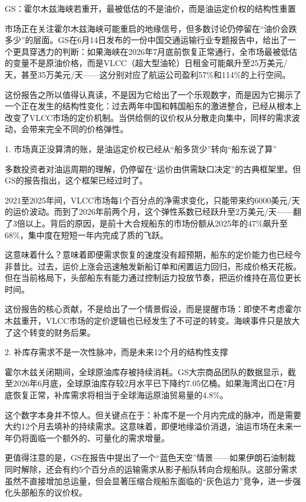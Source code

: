 \documentclass[11pt]{ctexart}
\begin{document}
GS：霍尔木兹海峡若重开，最被低估的不是油价，而是油运定价权的结构性重置

市场正在关注霍尔木兹海峡可能重启的地缘信号，但多数讨论仍停留在“油价会跌多少”的层面。GS在6月14日发布的一份中国交通运输行业专题报告中，给出了一个更具穿透力的判断：如果海峡在2026年7月底前恢复正常通行，全市场最被低估的变量不是原油价格，而是VLCC（超大型油轮）日租金可能飙升至25万美元/天，甚至35万美元/天——这分别对应了航运公司盈利57\%和114\%的上行空间。

这份报告之所以值得认真读，不是因为它给出了一个乐观数字，而是因为它揭示了一个正在发生的结构性变化：过去两年中国和韩国船东的激进整合，已经从根本上改变了VLCC市场的定价机制。当供给侧的议价权从分散走向集中，同样的需求波动，会带来完全不同的价格弹性。

1. 市场真正没算清的账，是油运定价权已经从“船多货少”转向“船东说了算”

多数投资者对油运周期的理解，仍停留在“运价由供需缺口决定”的古典框架里。但GS的报告指出，这个框架已经过时了。

2021至2025年间，VLCC市场每1个百分点的净需求变化，只能带来约6000美元/天的运价波动。而到了2026年前两个月，这个弹性系数已经跃升至2万美元/天——翻了3倍以上。背后的原因，是前十大合规船东的市场份额从2025年的47\%飙升至68\%，集中度在短短一年内完成了质的飞跃。

这意味着什么？意味着即便需求恢复的速度没有超预期，船东的定价能力也已经今非昔比。过去，运价上涨会迅速触发新船订单和闲置运力回归，形成价格天花板。但在当前格局下，头部船东有能力通过控制运力投放节奏，把运价维持在高位更长时间。

这份报告的核心贡献，不是给出了一个情景假设，而是提醒市场：即使不考虑霍尔木兹重开，VLCC市场的定价逻辑也已经发生了不可逆的转变。海峡事件只是放大了这个转变的财务后果。

2. 补库存需求不是一次性脉冲，而是未来12个月的结构性支撑

霍尔木兹关闭期间，全球原油库存被持续消耗。GS大宗商品团队的数据显示，截至2026年6月底，全球原油库存较2月水平已下降约7.05亿桶。如果海湾出口在7月底恢复正常，补库需求将相当于全球海运原油贸易量的4.8\%。

这个数字本身并不惊人。但关键点在于：补库不是一个月内完成的脉冲，而是需要大约12个月去填补的持续需求。这意味着，即便地缘溢价消退，油运市场在未来一年仍将面临一个额外的、可量化的需求增量。

更值得注意的是，GS在报告中提出了一个“蓝色天空”情景——如果伊朗石油制裁同时解除，还会有约5个百分点的运输需求从影子船队转向合规船队。这部分需求虽然不直接增加总运量，但会显著压缩合规船东面临的“灰色运力”竞争，进一步强化头部船东的议价权。
\end{document}
